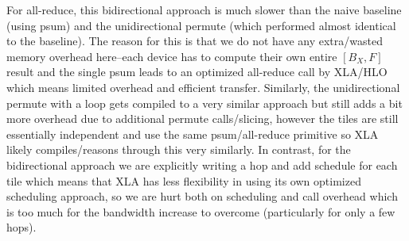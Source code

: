 \documentclass[11pt]{article}
\begin{document}
For all-reduce, this bidirectional approach is much slower than the naive baseline (using psum) and the
unidirectional permute (which performed almost identical to the baseline). The reason for this is that we 
do not have any extra/wasted memory overhead here--each device has to compute their own entire $[B_X, F]$ result
and the single psum leads to an optimized all-reduce call by XLA/HLO which means limited overhead and efficient
transfer. Similarly, the unidirectional permute with a loop gets compiled to a very similar approach but still
adds a bit more overhead due to additional permute calls/slicing, however the tiles are still essentially independent
and use the same psum/all-reduce primitive so XLA likely compiles/reasons through this very similarly. In contrast, for 
the bidirectional approach we are explicitly writing a hop and add schedule for each tile which means that XLA
has less flexibility in using its own optimized scheduling approach, so we are hurt both on scheduling and call overhead
which is too much for the bandwidth increase to overcome (particularly for only a few hops).
\end{document}
